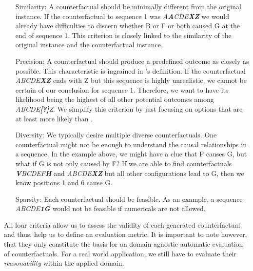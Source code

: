 \documentclass[./../../paper.tex]{subfiles}
\begin{document}
\begin{itemize}
    \item[Similarity:] A counterfactual should be minimally different from the original instance. If the counterfactual to sequence 1 was \textit{A\textbf{A}CDE\textbf{XZ}} we would already have difficulties to discern whether B or F or both caused G at the end of sequence 1. This criterion is closely linked to the similarity of the original instance and the counterfactual instance.
    \item[Precision:] A counterfactual should produce a predefined outcome as closely as possible. This characteristic is ingrained in \citeauthor{molnar2019}'s definition. If the counterfactual \textit{ABCDE\textbf{XZ}} ends with Z but this sequence is highly unrealistic, we cannot be certain of our conclusion for sequence 1. Therefore, we want to have its likelihood being the highest of all other potential outcomes among \textit{ABCDE\textbf{[?]}Z}. We simplify this criterion by just focusing on options that are at least more likely than .
    \item[Diversity:] We typically desire multiple diverse counterfactuals.  One counterfactual might not be enough to understand the causal relationships in a sequence. In the example above, we might have a clue that F causes G, but what if G is not only caused by F? If we are able to find counterfactuals \textit{\textbf{V}BCDEF\textbf{H}} and \textit{ABCDE\textbf{XZ}} but all other configurations lead to G, then we know positions 1 and 6 cause G. 
    \item[Sparsity:] Each counterfactual should be feasible. As an example, a sequence \textit{ABCDE\textbf{1G}} would not be feasible if numericals are not allowed. 
\end{itemize}

All four criteria allow us to assess the validity of each generated counterfactual and thus, help us to define an evaluation metric. It is important to note however, that they only constitute the basis for an domain-agnostic automatic evaluation of counterfactuals. For a real world application, we still have to evaluate their \emph{reasonability} within the applied domain.
\end{document}
